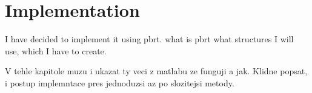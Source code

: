 \chapter{Implementation}
I have decided to implement it using pbrt. what is pbrt what structures I will use, which I have to create.

V tehle kapitole muzu i ukazat ty veci z matlabu ze funguji a jak.
Klidne popsat, i postup implemntace pres jednoduzsi az po slozitejsi metody.




